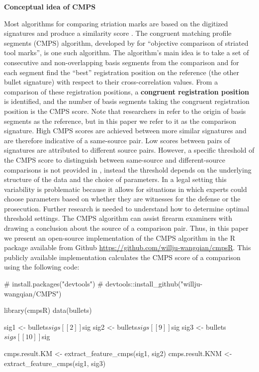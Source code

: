\textbf{Conceptual idea of CMPS}

Most algorithms for comparing striation marks are based on the digitized
signatures and produce a similarity score
\citep[\citet{ChumbleyL_Scott2010VoTM}, \citet{aoas},
\citet{pmid30444940}]{song2005}. The congruent matching profile segments
(CMPS) algorithm, developed by \citet{cmps} for ``objective comparison
of striated tool marks'', is one such algorithm. The algorithm's main
idea is to take a set of consecutive and non-overlapping basis segments
from the comparison and for each segment find the ``best'' registration
position on the reference (the other bullet signature) with respect to
their cross-correlation values. From a comparison of these registration
positions, a \textbf{congruent registration position} is identified, and
the number of basis segments taking the congruent registration position
is the CMPS score. Note that researchers in \citet{cmps} refer to the
origin of basis segments as the reference, but in this paper we refer to
it as the comparison signature. High CMPS scores are achieved between
more similar signatures and are therefore indicative of a same-source
pair. Low scores between pairs of signatures are attributed to different
source pairs. However, a specific threshold of the CMPS score to
distinguish between same-source and different-source comparisons is not
provided in \citet{cmps}, instead the threshold depends on the
underlying structure of the data and the choice of parameters. In a
legal setting this variability is problematic because it allows for
situations in which experts could choose parameters based on whether
they are witnesses for the defense or the prosecution. Further research
is needed to understand how to determine optimal threshold settings. The
CMPS algorithm can assist firearm examiners with drawing a conclusion
about the source of a comparison pair. Thus, in this paper we present an
open-source implementation of the CMPS algorithm in the R package
 available from Github
\url{https://github.com/willju-wangqian/cmpsR}. This publicly available
implementation calculates the CMPS score of a comparison using the
following code:

\begin{Schunk}
\begin{Sinput}
# install.packages("devtools") 
# devtools::install_github("willju-wangqian/CMPS")

library(cmpsR)
data(bullets)

sig1 <- bullets$sigs[[2]]$sig
sig2 <- bullets$sigs[[9]]$sig
sig3 <- bullets$sigs[[10]]$sig

cmps.result.KM <- extract_feature_cmps(sig1, sig2)
cmps.result.KNM <- extract_feature_cmps(sig1, sig3)
\end{Sinput}
\end{Schunk}

